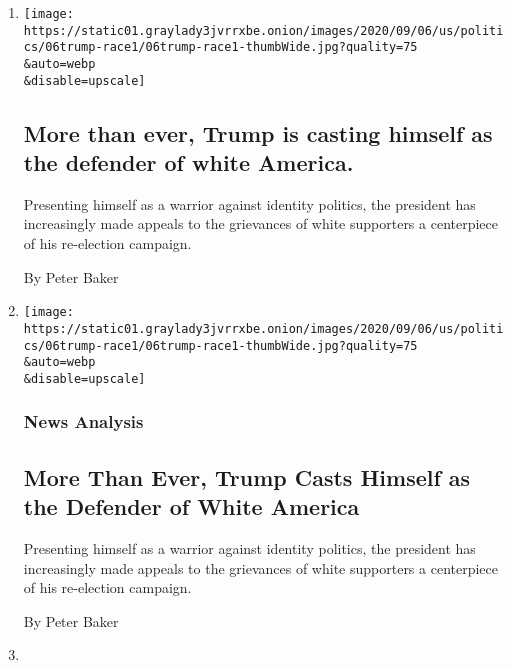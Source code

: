 \begin{enumerate}
\def\labelenumi{\arabic{enumi}.}
\item
  \href{/live/2020/09/07/us/trump-vs-biden/more-than-ever-trump-is-casting-himself-as-the-defender-of-white-america}{}

  \texttt{[image: https://static01.graylady3jvrrxbe.onion/images/2020/09/06/us/politics/06trump-race1/06trump-race1-thumbWide.jpg?quality=75\\\&auto=webp\\\&disable=upscale]}

  \hypertarget{more-than-ever-trump-is-casting-himself-as-the-defender-of-white-america}{%
  \subsection{More than ever, Trump is casting himself as the defender
  of white
  America.}\label{more-than-ever-trump-is-casting-himself-as-the-defender-of-white-america}}

  Presenting himself as a warrior against identity politics, the
  president has increasingly made appeals to the grievances of white
  supporters a centerpiece of his re-election campaign.

  By Peter Baker
\item
  \href{/2020/09/06/us/politics/trump-race-2020-election.html}{}

  \texttt{[image: https://static01.graylady3jvrrxbe.onion/images/2020/09/06/us/politics/06trump-race1/06trump-race1-thumbWide.jpg?quality=75\\\&auto=webp\\\&disable=upscale]}

  \hypertarget{news-analysis}{%
  \subsubsection{News Analysis}\label{news-analysis}}

  \hypertarget{more-than-ever-trump-casts-himself-as-the-defender-of-white-america}{%
  \subsection{More Than Ever, Trump Casts Himself as the Defender of
  White
  America}\label{more-than-ever-trump-casts-himself-as-the-defender-of-white-america}}

  Presenting himself as a warrior against identity politics, the
  president has increasingly made appeals to the grievances of white
  supporters a centerpiece of his re-election campaign.

  By Peter Baker
\item
  \href{/live/2020/09/04/us/trump-vs-biden/as-biden-campaign-seizes-on-a-report-that-he-insulted-fallen-soldiers-trump-continues-to-deny-it}{}


\end{enumerate}
